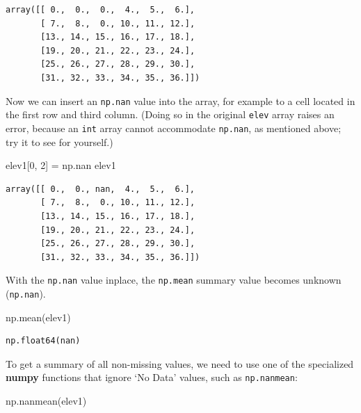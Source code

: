 \documentclass[
  letterpaper,
]{krantz}
\newenvironment{Shaded}{\begin{snugshade}}{\end{snugshade}}
\newcommand{\DecValTok}[1]{\textcolor[rgb]{0.68,0.00,0.00}{#1}}
\newcommand{\NormalTok}[1]{\textcolor[rgb]{0.00,0.23,0.31}{#1}}
\newcommand{\OperatorTok}[1]{\textcolor[rgb]{0.37,0.37,0.37}{#1}}
\begin{document}
\begin{verbatim}
array([[ 0.,  0.,  0.,  4.,  5.,  6.],
       [ 7.,  8.,  0., 10., 11., 12.],
       [13., 14., 15., 16., 17., 18.],
       [19., 20., 21., 22., 23., 24.],
       [25., 26., 27., 28., 29., 30.],
       [31., 32., 33., 34., 35., 36.]])
\end{verbatim}

Now we can insert an \texttt{np.nan} value into the array, for example
to a cell located in the first row and third column. (Doing so in the
original \texttt{elev} array raises an error, because an \texttt{int}
array cannot accommodate \texttt{np.nan}, as mentioned above; try it to
see for yourself.)

\begin{Shaded}
\begin{Highlighting}[]
\NormalTok{elev1[}\DecValTok{0}\NormalTok{, }\DecValTok{2}\NormalTok{] }\OperatorTok{=}\NormalTok{ np.nan}
\NormalTok{elev1}
\end{Highlighting}
\end{Shaded}

\begin{verbatim}
array([[ 0.,  0., nan,  4.,  5.,  6.],
       [ 7.,  8.,  0., 10., 11., 12.],
       [13., 14., 15., 16., 17., 18.],
       [19., 20., 21., 22., 23., 24.],
       [25., 26., 27., 28., 29., 30.],
       [31., 32., 33., 34., 35., 36.]])
\end{verbatim}

With the \texttt{np.nan} value inplace, the \texttt{np.mean} summary
value becomes unknown (\texttt{np.nan}).

\begin{Shaded}
\begin{Highlighting}[]
\NormalTok{np.mean(elev1)}
\end{Highlighting}
\end{Shaded}

\begin{verbatim}
np.float64(nan)
\end{verbatim}

To get a summary of all non-missing values, we need to use one of the
specialized \textbf{numpy} functions that ignore `No Data' values, such
as \texttt{np.nanmean}:

\begin{Shaded}
\begin{Highlighting}[]
\NormalTok{np.nanmean(elev1)}
\end{Highlighting}
\end{Shaded}
\end{document}
